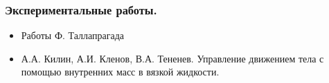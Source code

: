 \begin{frame}
\frametitle{Экспериментальные работы.}

	\begin{itemize}
		\item Работы Ф. Таллапрагада
		\begin{figure}[h]
		\end{figure}
		
		\item А.А. Килин, А.И. Кленов, В.А. Тененев. Управление движением тела с помощью внутренних масс в вязкой жидкости.
		\begin{figure}[h]
		\end{figure}
		

	\end{itemize}

%		
%

\end{frame}





